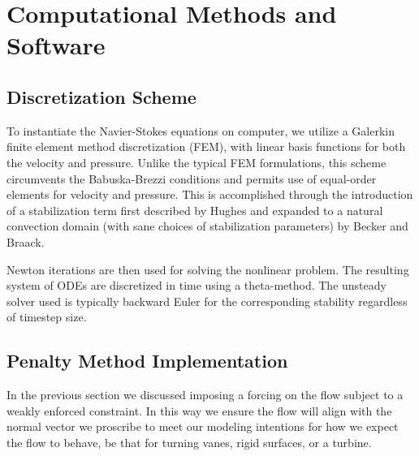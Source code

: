 \section{Computational Methods and Software}
\label{sec:software}


\subsection{Discretization Scheme}

To instantiate the Navier-Stokes equations on computer, we utilize a
Galerkin finite element method discretization (FEM), with linear basis
functions for both the velocity and pressure. Unlike the typical FEM
formulations, this scheme circumvents the Babuska-Brezzi
conditions\cite{bb-cond} and 
permits use of equal-order elements for velocity and 
pressure. This is accomplished through the introduction of a
stabilization term first described by Hughes\cite{Hughes198685} and
expanded to a natural convection domain (with sane choices of
stabilization parameters) by Becker and Braack\cite{Becker2002428}. 

Newton iterations are then used for solving the nonlinear problem. 
The resulting system of ODEs are discretized in time using a theta-method. 
The unsteady solver used is typically backward Euler for the corresponding
stability regardless of timestep size. 

\subsection{Penalty Method Implementation}

In the previous section we discussed imposing a forcing on 
the flow subject to a weakly enforced constraint. In this way we ensure 
the flow will align with the normal vector we proscribe to meet our
modeling intentions for how we expect the flow to behave, be that for
turning vanes, rigid surfaces, or a turbine. 

